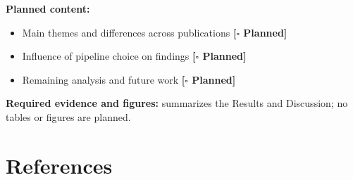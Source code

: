 \documentclass[conference]{IEEEtran}
\newcommand{\planned}{\textcolor{blue!60!black}{\textbf{[$\square$ Planned]}}}
\begin{document}
\textbf{Planned content:}
\begin{itemize}
    \item Main themes and differences across publications \planned
    \item Influence of pipeline choice on findings \planned
    \item Remaining analysis and future work \planned
\end{itemize}

\textbf{Required evidence and figures:} summarizes the Results and Discussion; no tables or figures are planned.

\newpage
\section*{References}
\printbibliography[heading=none]
\end{document}
